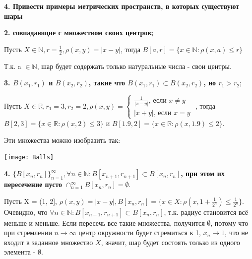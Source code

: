 \documentclass{article}
\begin{document}
\noindent \textbf{4. Привести примеры метрических пространств, в которых существуют шары}

\textbf{2. совпадающие с множеством своих центров;}

Пусть $X \in \mathbb {N}, r = \frac{1}{2}, \rho(x,y) = \lvert x - y \rvert$, тогда $B[a, r] = \{ x \in \mathbb {N}: \rho(x, a) \leqslant r\}$

Т.к. a $\in \mathbb {N}$, шар будет содержать только натуральные числа - свои центры.

\textbf{3. $B(x_1, r_1)$ и $B(x_2, r_2)$, такие что $B(x_1, r_1) \subset B(x_2, r_2)$, но $r_1 > r_2;$}

Пусть $X \in \mathbb {R},  r_1 = 3, r_2 = 2,  \rho(x,y) =
  \begin{cases}
    \frac{1}{\lvert x - y \rvert} \text{, если } x \neq y\\
    \lvert x + y \rvert \text{, если } x = y 
  \end{cases}$
, тогда $B[2, 3] = \{ x \in \mathbb {R}: \rho(x, 2) \leqslant 3\}$ и $B[1.9, 2] = \{ x \in \mathbb {R}: \rho(x, 1.9) \leqslant 2\}$. 

Эти множества можно изобразить так:


\texttt{[image: Balls]}


\textbf{4. $\{B[x_n, r_n]\}^{\infty}_{n=1}, \forall n \in \mathbb {N}: B[x_{n+1}, r_{n+1}] \subset B[x_n, r_n]$, при этом их пересечение пусто $\cap^{\infty}_{n=1} B[x_n, r_n] = \emptyset.$}

Пусть X = (1, 2],  $\rho(x, y) = \lvert x - y \rvert, B[x_n, r_n] = \{x \in X: \rho(x, 1 + \frac{1}{2^n}) \leqslant \frac{1}{2^n}\}$. Очевидно, что $\forall n \in \mathbb {N}: B[x_{n+1}, r_{n+1}] \subset B[x_n, r_n]$, т.к. радиус становится всё меньше и меньше. Если пересечь все такие множества, получится $\emptyset$, потому что при стремлении $n \to \infty$ центр окружности будет стремиться к 1, $x_n \to 1$, что не входит в заданное множество $X$, значит, шар будет состоять только из одного элемента - $\emptyset$. 
\end{document}
